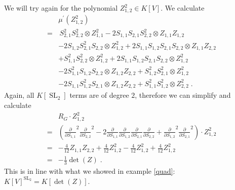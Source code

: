 \begin{example}
  We will try again for the polynomial $Z_{1,2}^2 \in K[V]$.
  We calculate
  \begin{equation*}
    \begin{aligned}
      &\mu^\prime ( Z_{1,2}^2 ) \\
      =& \, S_{2,1}^2 S_{2,2}^2 \otimes Z_{1,1}^2
      - 2S_{1,1}S_{2,1}S_{2,2}^2 \otimes Z_{1,1}Z_{1,2} \\
      &- 2S_{1,2}S_{2,1}^2S_{2,2} \otimes Z_{1,2}^2 
      + 2S_{1,1}S_{1,2}S_{2,1}S_{2,2} \otimes Z_{1,1}Z_{2,2}\\
      &+ S_{1,1}^2S_{2,2}^2 \otimes Z_{1,2}^2
      + 2S_{1,1}S_{1,2}S_{2,1}S_{2,2} \otimes Z_{1,2}^2 \\
      &- 2S_{1,1}^2S_{1,2}S_{2,2} \otimes Z_{1,2}Z_{2,2}
      + S_{1,2}^2S_{2,1}^2 \otimes Z_{1,2}^2 \\
      &- 2S_{1,1}S_{1,2}^2S_{2,1} \otimes Z_{1,2}Z_{2,2}
      + S_{1,1}^2S_{1,2}^2 \otimes Z_{2,2}^2 \; .
    \end{aligned}
  \end{equation*}
  Again, all $K[\operatorname{SL}_2]$ terms are of degree $2$, therefore we can simplify and calculate
  \begin{equation*}
    \begin{aligned}
      &R_G \cdot Z_{1,2}^2\\
      =& \left( \frac{\partial}{\partial S_{1,1}}^2 \frac{\partial}{\partial S_{2,2}}^2 - 2 \frac{\partial}{\partial S_{1,1}} \frac{\partial}{\partial S_{1,2}} \frac{\partial}{\partial S_{2,1}} \frac{\partial}{\partial S_{2,2}} + \frac{\partial}{\partial S_{1,2}}^2\frac{\partial}{\partial S_{2,1}}^2 \right) \cdot Z_{1,2}^2 \\
      =& - \frac{4}{12} Z_{1,1}Z_{2,2} + \frac{4}{12} Z_{1,2}^2 - \frac{4}{12} Z_{1,2}^2 + \frac{4}{12} Z_{1,2}^2 \\
      =& -\frac{1}{3}\operatorname{det}(Z) \; .
    \end{aligned}
  \end{equation*}
  This is in line with what we showed in example \ref{quad}: $K[V]^{\operatorname{SL}_2} = K[\operatorname{det}(Z)]$.
\end{example}

